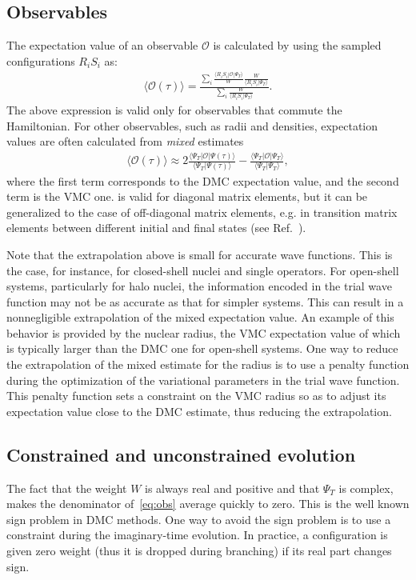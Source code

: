 \documentclass[aps,prc,twocolumn,superscriptaddress,floatfix]{revtex4-1}
\begin{document}
\subsection{Observables}
\label{sec:obs}
The expectation value of an observable $\mathcal O$ is calculated by using the sampled configurations $R_iS_i$ as:
\begin{align}
\displaystyle\langle \mathcal O(\tau)\rangle=\frac{\displaystyle\sum_i \frac{\langle R_iS_i|\mathcal O|\Psi_T\rangle}{W}\frac{W}{\langle R_iS_i|\Psi_T\rangle}}
{\displaystyle\sum_i\frac{W}{\langle R_iS_i|\Psi_T\rangle}}.
\label{eq:obs}
\end{align}
The above expression is valid only for observables that commute the Hamiltonian.
For other observables, such as radii and densities, expectation values are often calculated from \emph{mixed} estimates 
\begin{align}
\langle\mathcal O(\tau)\rangle\approx2\frac{\langle\Psi_T|\mathcal O|\Psi(\tau)\rangle}{\langle\Psi_T|\Psi(\tau)\rangle}
-\frac{\langle\Psi_T|\mathcal O|\Psi_T\rangle}{\langle\Psi_T|\Psi_T\rangle}	,
\label{eq:mix}
\end{align}
where the first term corresponds to the DMC expectation value, and the second term is the VMC one.
 is valid for diagonal matrix elements, but it can be generalized to the case of off-diagonal matrix 
elements, e.g. in transition matrix elements between different initial and final states
(see Ref.~\cite{Pervin:2007}). 

Note that the extrapolation above is small for accurate wave functions.
This is the case, for instance, for closed-shell nuclei and single operators.
For open-shell systems, particularly for halo nuclei, the information encoded in the trial
wave function may not be as accurate as that for simpler systems. This can result in
a nonnegligible extrapolation of the mixed expectation value.
An example of this behavior is provided by the nuclear radius, 
the VMC expectation value of which is typically larger than the DMC one
for open-shell systems. One way to reduce the extrapolation of the mixed estimate for the radius
is to use a penalty function during the optimization of the variational parameters 
in the trial wave function. This penalty function sets a constraint on the VMC radius so as to
adjust its expectation value close to the DMC estimate, thus reducing the extrapolation.


\subsection{Constrained and unconstrained evolution}
\label{sec:cp}
The fact that the weight $W$ is always real and positive and that $\Psi_T$ is complex, 
makes the denominator of~\cref{eq:obs} average quickly to zero. 
This is the well known sign problem in DMC methods.
One way to avoid the sign problem is to use a constraint during the imaginary-time evolution. 
In practice, a configuration is given zero weight (thus it is dropped during branching) 
if its real part changes sign.
\end{document}
